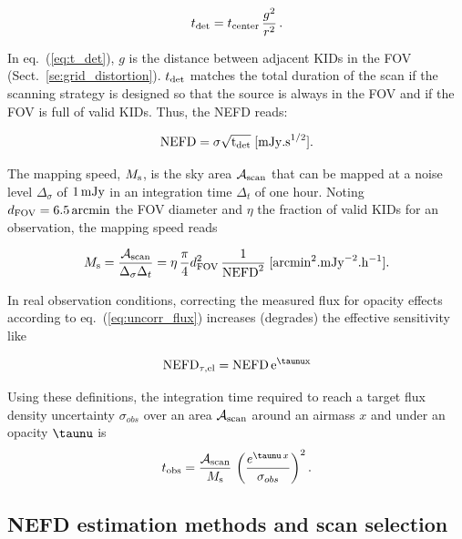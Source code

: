 \begin{equation}
  t_{\rm{det}} = t_{\rm{center}}\, \frac{g^2}{r^2}\,.
\label{eq:t_det}
\end{equation}

In eq.~(\ref{eq:t_det}), $g$ is the distance between adjacent KIDs in the FOV
(Sect.~\ref{se:grid_distortion}). $t_{\rm{det}}$ matches the total duration of
the scan if the scanning strategy is designed so that the source is always in
the FOV and if the FOV is full of valid KIDs. Thus, the NEFD reads:

\begin{equation}
  \rm{NEFD} = \sigma \sqrt{t_{\rm{det}}}\; [\rm{mJy.s}^{1/2}].
\label{eq:nefd_def}
\end{equation}

The mapping speed, $M_{\rm{s}}$, is the sky area $\mathcal{A}_{\rm{scan}}$ that
can be mapped at a noise level $\Delta_\sigma$ of $1\,\rm{mJy}$ in an
integration time $\Delta_t$ of one hour. Noting $d_{\rm{FOV}} =
6.5\,\rm{arcmin}$ the FOV diameter and $\eta$ the fraction of valid KIDs for an
observation, the mapping speed reads

\begin{equation}
M_{\rm{s}} = \frac{\mathcal{A}_{\rm{scan}}}{\Delta_\sigma\Delta_t} = 
\eta \, \frac{\pi}{4} d_{\rm{FOV}}^2 \, \frac{1}{\rm{NEFD}^2}\; [\rm{arcmin}^2.\rm{mJy}^{-2}.\rm{h}^{-1}].
\label{eq:mapping_speed}
\end{equation}

In real observation conditions, correcting the measured flux for opacity effects
according to eq.~(\ref{eq:uncorr_flux}) increases (degrades) the effective
sensitivity like

\begin{equation}
\rm{NEFD}_{\tau,el} = \rm{NEFD}\, e^{\taunu x}
\label{eq:nefd_tau_el}
\end{equation}

Using these definitions, the integration time required to reach a target flux
density uncertainty $\sigma_{obs}$ over an area $\mathcal{A}_{\rm{scan}}$ around
an airmass $x$ and under an opacity $\taunu$ is
\begin{equation}
  t_{\rm{obs}} = \frac{\mathcal{A}_{\rm{scan}}}{ M_{\rm{s}}} \, \left(\frac{e^{\taunu\, x}}{\sigma_{obs}}\right)^2.
\end{equation}


\subsection{NEFD estimation methods and scan selection}
\label{se:nefd_method}

